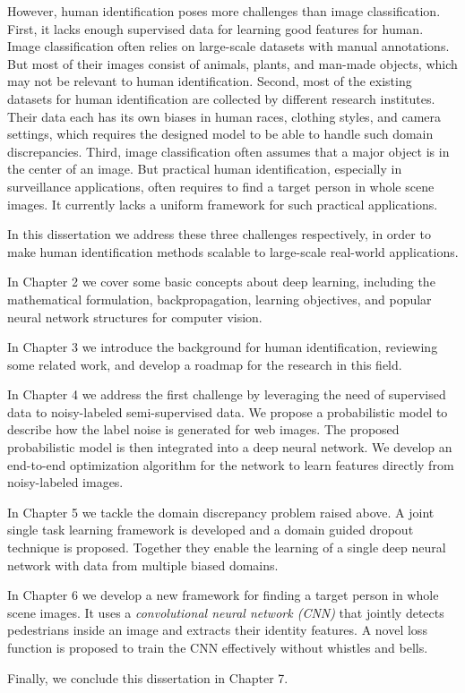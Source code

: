 However, human identification poses more challenges than image classification. First, it lacks enough supervised data for learning good features for human. Image classification often relies on large-scale datasets with manual annotations. But most of their images consist of animals, plants, and man-made objects, which may not be relevant to human identification. Second, most of the existing datasets for human identification are collected by different research institutes. Their data each has its own biases in human races, clothing styles, and camera settings, which requires the designed model to be able to handle such domain discrepancies. Third, image classification often assumes that a major object is in the center of an image. But practical human identification, especially in surveillance applications, often requires to find a target person in whole scene images. It currently lacks a uniform framework for such practical applications.

In this dissertation we address these three challenges respectively, in order to make human identification methods scalable to large-scale real-world applications.

In Chapter 2 we cover some basic concepts about deep learning, including the mathematical formulation, backpropagation, learning objectives, and popular neural network structures for computer vision.

In Chapter 3 we introduce the background for human identification, reviewing some related work, and develop a roadmap for the research in this field.

In Chapter 4 we address the first challenge by leveraging the need of supervised data to noisy-labeled semi-supervised data. We propose a probabilistic model to describe how the label noise is generated for web images. The proposed probabilistic model is then integrated into a deep neural network. We develop an end-to-end optimization algorithm for the network to learn features directly from noisy-labeled images.

In Chapter 5 we tackle the domain discrepancy problem raised above. A joint single task learning framework is developed and a domain guided dropout technique is proposed. Together they enable the learning of a single deep neural network with data from multiple biased domains.

In Chapter 6 we develop a new framework for finding a target person in whole scene images. It uses a \emph{convolutional neural network (CNN)} that jointly detects pedestrians inside an image and extracts their identity features. A novel loss function is proposed to train the CNN effectively without whistles and bells.

Finally, we conclude this dissertation in Chapter 7.
